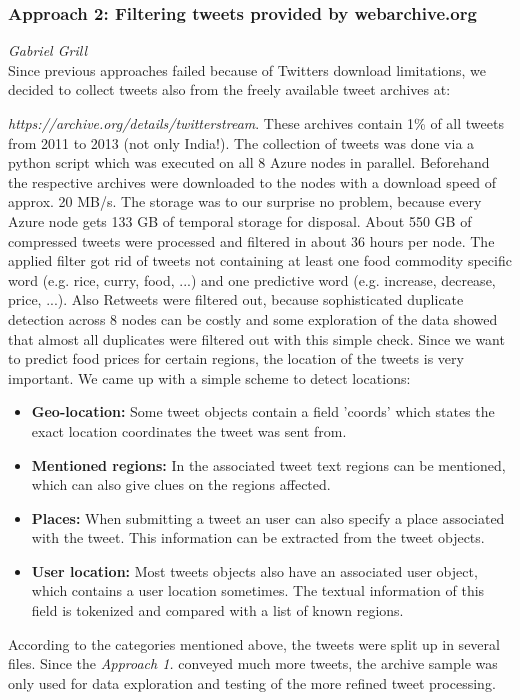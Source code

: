 \subsubsection*{Approach 2: Filtering tweets provided by webarchive.org}
\emph{Gabriel Grill} \\
Since previous approaches failed because of Twitters download limitations, we decided to collect tweets also from the freely available tweet archives at:

\emph{https://archive.org/details/twitterstream}.
\newline
These archives contain 1\% of all tweets from 2011 to 2013 (not only India!). The collection of tweets was done via a python script which was executed on all 8 Azure nodes in parallel. Beforehand the respective archives were downloaded to the nodes with a download speed of approx. 20 MB/s. The storage was to our surprise no problem, because every Azure node gets 133 GB of temporal storage for disposal. About 550 GB of compressed tweets were processed and filtered in about 36 hours per node.
\newline
The applied filter got rid of tweets not containing at least one food commodity specific word (e.g. rice, curry, food, ...) and one predictive word (e.g. increase, decrease, price, ...). Also Retweets were filtered out, because sophisticated duplicate detection across 8 nodes can be costly and some exploration of the data showed that almost all duplicates were filtered out with this simple check. Since we want to predict food prices for certain regions, the location of the tweets is very important. We came up with a simple scheme to detect locations:
\begin{itemize}
\item \textbf{Geo-location:} Some tweet objects contain a field 'coords' which states the exact location coordinates the tweet was sent from.
\item \textbf{Mentioned regions:} In the associated tweet text regions can be mentioned, which can also give clues on the regions affected.
\item \textbf{Places:} When submitting a tweet an user can also specify a place associated with the tweet. This information can be extracted from the tweet objects.
\item \textbf{User location:} Most tweets objects also have an associated user object, which contains a user location sometimes. The textual information of this field is tokenized and compared with a list of known regions.
\end{itemize}
According to the categories mentioned above, the tweets were split up in several files. Since the \emph{Approach 1.} conveyed much more tweets, the archive sample was only used for data exploration and testing of the more refined tweet processing.

